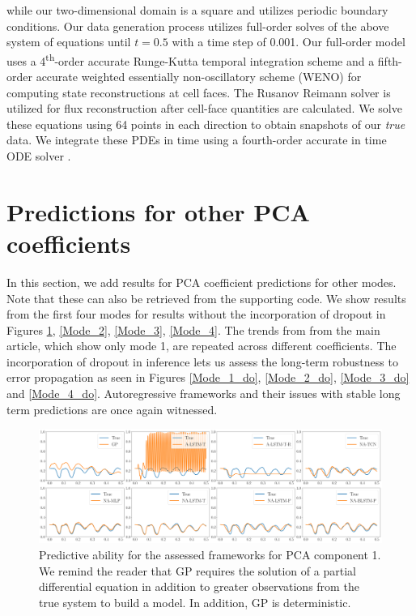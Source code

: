 \documentclass[12pt]{article}
\begin{document}
while our two-dimensional domain is a square and utilizes periodic boundary conditions. Our data generation process utilizes full-order solves of the above system of equations until $t=0.5$ with a time step of 0.001. Our full-order model uses a 4\textsuperscript{th}-order accurate Runge-Kutta temporal integration scheme and a fifth-order accurate weighted essentially non-oscillatory scheme (WENO) \cite{liu1994weighted} for computing state reconstructions at cell faces. The Rusanov Reimann solver is utilized for flux reconstruction after cell-face quantities are calculated. We solve these equations using 64 points in each direction to obtain snapshots of our \emph{true} data. We integrate these PDEs in time using a fourth-order accurate in time ODE solver \cite{hairer1991solving}.


\section{Predictions for other PCA coefficients}

In this section, we add results for PCA coefficient predictions for other modes. Note that these can also be retrieved from the supporting code. We show results from the first four modes for results without the incorporation of dropout in Figures \ref{Mode_1}, \ref{Mode_2}, \ref{Mode_3}, \ref{Mode_4}. The trends from from the main article, which show only mode 1, are repeated across different coefficients. The incorporation of dropout in inference lets us assess the long-term robustness to error propagation as seen in Figures \ref{Mode_1_do}, \ref{Mode_2_do}, \ref{Mode_3_do} and \ref{Mode_4_do}. Autoregressive frameworks and their issues with stable long term predictions are once again witnessed.

\begin{figure}[h]
    \centering
    \includegraphics[width=\textwidth]{Figure_1.png}
    \caption{Predictive ability for the assessed frameworks for PCA component 1. We remind the reader that GP requires the solution of a partial differential equation in addition to greater observations from the true system to build a model. In addition, GP is deterministic.}
    \label{Mode_1}
\end{figure}
\end{document}
